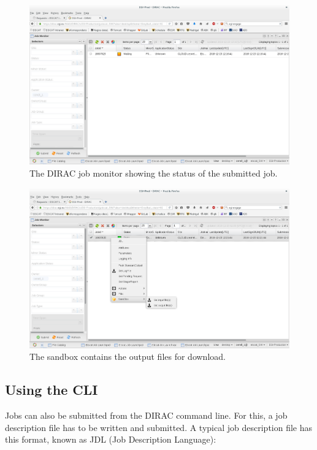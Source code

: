 \documentclass[a4paper]{article}
\begin{document}
\begin{figure}[htb]
  \centering
  \includegraphics[width=1.0\linewidth]{dirac-gui-jobmon}
  \caption{The DIRAC job monitor showing the status of the submitted job.}
  \label{fig:monitor}
\end{figure}

\begin{figure}[htb]
  \centering
  \includegraphics[width=1.0\linewidth]{dirac-gui-job-get}
  \caption{The sandbox contains the output files for download.}
  \label{fig:sandbox}
\end{figure}

\subsection{Using the CLI}
\label{sec:using-cli}

Jobs can also be submitted from the DIRAC command line. For this, a job description file has to be written and submitted. A typical job description file has this format, known as JDL (Job Description Language):
\end{document}
